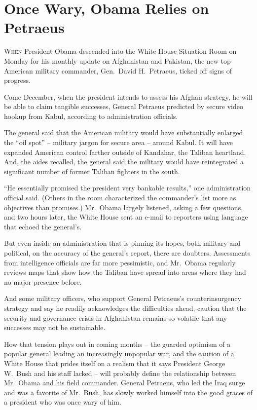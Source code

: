 ﻿\documentclass[12pt]{article}
\begin{document}
\pagebreak
\section{Once Wary, Obama Relies on Petraeus}

\lettrine{W}{hen} President Obama descended into the White House Situation
Room on Monday for his monthly update on Afghanistan and Pakistan, the new top American military
commander, Gen.~David H.~Petraeus, ticked off signs of progress.

Come December, when the president intends to assess his Afghan strategy, he will be able to claim
tangible successes, General Petraeus predicted by secure video hookup from Kabul, according to
administration officials.

The general said that the American military would have substantially enlarged the ``oil spot'' --
military jargon for secure area -- around Kabul. It will have expanded American control farther
outside of Kandahar, the Taliban heartland. And, the aides recalled, the general said the military
would have reintegrated a significant number of former Taliban fighters in the south.

``He essentially promised the president very bankable results,'' one administration official said.
(Others in the room characterized the commander's list more as objectives than promises.) Mr.~Obama
largely listened, asking a few questions, and two hours later, the White House sent an e-mail to
reporters using language that echoed the general's.

But even inside an administration that is pinning its hopes, both military and political, on the
accuracy of the general's report, there are doubters. Assessments from intelligence officials are
far more pessimistic, and Mr.~Obama regularly reviews maps that show how the Taliban have spread
into areas where they had no major presence before.

And some military officers, who support General Petraeus's counterinsurgency strategy and say he
readily acknowledges the difficulties ahead, caution that the security and governance crisis in
Afghanistan remains so volatile that any successes may not be sustainable.

How that tension plays out in coming months -- the guarded optimism of a popular general leading an
increasingly unpopular war, and the caution of a White House that prides itself on a realism that it
says President George W.~Bush and his staff lacked -- will probably define the relationship between
Mr.~Obama and his field commander. General Petraeus, who led the Iraq surge and was a favorite of
Mr.~Bush, has slowly worked himself into the good graces of a president who was once wary of him.
\end{document}

